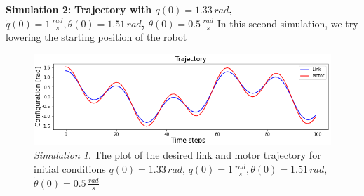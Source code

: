 \documentclass[a4paper]{article}
\begin{document}
\textbf{Simulation 2:} \textbf{Trajectory with $q(0)=1.33\, rad$, $\dot{q}(0)=1\, \frac{rad}{s}, \theta(0)=1.51\, rad$, $\dot{\theta}(0)=0.5\, \frac{rad}{s}$}
In this second simulation, we try lowering the starting position of the robot

\begin{figure}
    \centering
    \includegraphics[scale=0.7]{img/final_results/elastic/300_2/76l_87m/traj_76_87.png}
    \caption{\textit{Simulation 1}. The plot of the desired link and motor trajectory for initial conditions $q(0)=1.33\, rad$, $\dot{q}(0)=1\, \frac{rad}{s}, \theta(0)=1.51\, rad$, $\dot{\theta}(0)=0.5\, \frac{rad}{s}$}
    \label{fig:desired_elastic_76_87}
\end{figure}
\end{document}
